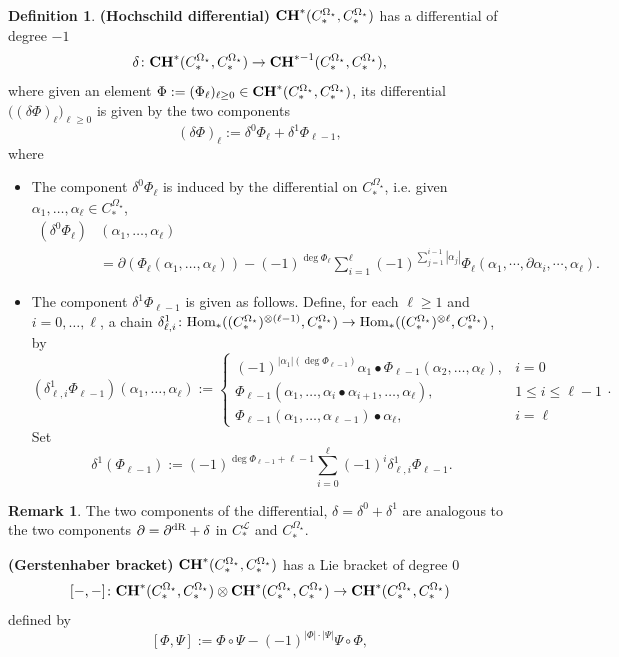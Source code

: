 \documentclass[10pt]{amsart}
\numberwithin{equation}{section}
\theoremstyle{plain}
\theoremstyle{definition}
\newtheorem{definition}[theorem]{Definition}
\newtheorem{remark}[theorem]{Remark}
\theoremstyle{remark}
\numberwithin{equation}{section}
\newcommand{\Hom}{\textup{Hom}}
\newcommand{\dR}{\textup{dR}}
\newcommand{\CC}{\textbf{\textup{CH}}}
\newcommand{\CFr}{C_*^\mathscr{L}}
\newcommand{\CBa}{C_*^{\Omega_\star}}
\begin{document}
{\begin{definition}
\textbf{{(Hochschild differential)}} $\CC^*(\CBa,\CBa)$ has a differential of degree $-1$ 
	\[
		\delta\colon \CC^*(\CBa,\CBa)\to \CC^{*-1}(\CBa,\CBa),
		\]  where given an element $\Phi:= (\Phi_\ell)_{\ell\geq 0}\in \CC^*(\CBa,\CBa)$, its differential $\big((\delta\Phi)_\ell\big)_{\ell\geq 0}$ is given by  the two components \[ (\delta \Phi)_\ell:= \delta^0 \Phi_\ell + \delta^1\Phi_{\ell -1}, \] where 
		\begin{itemize}
			\item The component $\delta^0\Phi_\ell$ is induced by the differential on $\CBa$, i.e. given $\alpha_1,\dots, \alpha_\ell\in \CBa$,  \begin{align*}
				(\delta^0\Phi_\ell)&(\alpha_1,\dots, \alpha_\ell) \\&= \partial(\Phi_\ell(\alpha_1,\dots, \alpha_\ell)) - (-1)^{\deg \Phi_\ell} \sum_{i=1}^\ell (-1)^{\sum_{j=1}^{i-1} |\alpha_j|}\Phi_\ell(\alpha_1,\cdots, \partial \alpha_i, \cdots, \alpha_\ell). 
			\end{align*} 	
			\item The component $\delta^1\Phi_{\ell-1}$ is given as follows. Define, for each $\ell\geq 1$ and $i=0,\dots, \ell$, a chain $\delta^1_{\ell,i}\colon \Hom_*((\CBa)^{\otimes (\ell-1)}, \CBa)\to \Hom_*((\CBa)^{\otimes \ell}, \CBa)$, by \[ (\delta^1_{\ell,i}\Phi_{\ell-1})(\alpha_1,\dots, \alpha_\ell) := \begin{cases}
				(-1)^{|\alpha_1|(\deg \Phi_{\ell-1})}\alpha_1\bullet \Phi_{\ell-1}(\alpha_2,\dots, \alpha_\ell) , & i = 0\\
				\Phi_{\ell-1}(\alpha_1,\dots, \alpha_i\bullet \alpha_{i+1}, \dots, \alpha_\ell) , & 1\leq i \leq \ell-1 \\
				\Phi_{\ell-1}(\alpha_1,\dots, \alpha_{\ell-1})\bullet \alpha_\ell, & i = \ell
			\end{cases}. \]
			Set \[ \delta^1(\Phi_{\ell-1}):= (-1)^{\deg \Phi_{\ell-1}+ \ell - 1} \sum_{i=0}^\ell (-1)^i \delta^1_{\ell,i}\Phi_{\ell-1}.\]
			\end{itemize}


\begin{remark}
	The two components of the differential, $\delta = \delta^0+\delta^1$ are  analogous to the two components $\partial = \partial^\dR + \delta$ in $\CFr$ and $\CBa$.
\end{remark}


\textbf{{(Gerstenhaber bracket)}} $\CC^*(\CBa,\CBa)$ has a Lie bracket of degree 0 \[
 [-,-]\colon \CC^*(\CBa,\CBa)\otimes \CC^*(\CBa,\CBa)\to \CC^*(\CBa,\CBa)
\] 
defined by \[ [\Phi,\Psi]:= \Phi \circ \Psi - (-1)^{|\Phi|\cdot |\Psi|} \Psi \circ \Phi, \]


\end{definition}}
\end{document}
